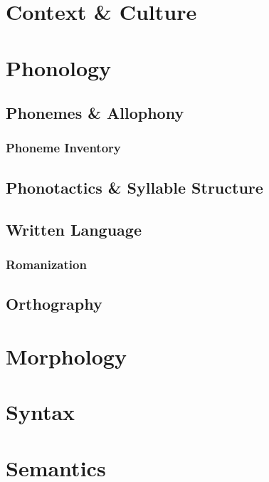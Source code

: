 \chapter{Context \& Culture}

\Blindtext[2]

\Blindtext[3]

\Blindtext[1]

\chapter{Phonology}

\section{Phonemes \& Allophony}

\subsection{Phoneme Inventory}

\section{Phonotactics \& Syllable Structure}

\section{Written Language}

\subsection{Romanization}

\section{Orthography}

\chapter{Morphology}

\chapter{Syntax}

\chapter{Semantics}